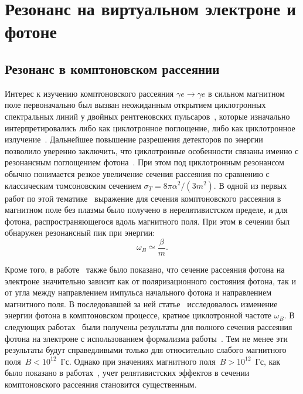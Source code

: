 \section{Резонанс на виртуальном электроне и фотоне}\label{sec:resonance}
\subsection{Резонанс в комптоновском рассеянии}
Интерес к изучению комптоновского рассеяния $\gamma e \to \gamma e$ в 
сильном магнитном поле первоначально был вызван неожиданным открытием циклотронных 
спектральных линий у двойных рентгеновских 
пульсаров~\cite{Truemper1978,Makishima1990,Grove1995}, которые изначально 
интерпретировались либо как циклотронное поглощение, либо как циклотронное 
излучение~\cite{Truemper1978}. Дальнейшее повышение разрешения детекторов по 
энергии позволило уверенно заключить, что циклотронные особенности связаны 
именно с резонансным поглощением фотона~\cite{Mihara:1990}.
При этом под циклотронным резонансом обычно понимается 
резкое увеличение сечения рассеяния по сравнению с классическим томсоновским 
сечением $\sigma_T = 8 \pi \alpha^2 /(3 m^2)$. В одной из первых 
работ по этой тематике~\cite{Canuto:1971} выражение для сечения 
комптоновского 
рассеяния в магнитном поле без плазмы было получено
в нерелятивистском пределе, и для фотона, 
распространяющегося вдоль магнитного поля. При этом в сечении был обнаружен резонансный 
пик при энергии:
\begin{equation}\label{eq:w_B}
	\omega_B\simeq \frac{\beta}{m}.
\end{equation}
 
Кроме того, в работе~\cite{Canuto:1971} также было показано, что сечение рассеяния фотона 
на электроне
значительно зависит как от поляризационного состояния фотона, так и от угла 
между направлением импульса начального фотона и направлением магнитного поля. В 
последовавшей за ней 
статье~\cite{Gnedin1973} 
исследовалось изменение энергии фотона в комптоновском процессе, кратное 
циклотронной частоте $\omega_B$. 
В следующих работах~\cite{Borner1979,Ventura:1979} 
были получены результаты для полного сечения рассеяния фотона на электроне с использованием формализма работы~\cite{Canuto:1971}. Тем не менее эти результаты будут справедливыми только для относительно слабого магнитного поля~$B<10^{12}$~Гс. Однако при значениях магнитного поля~$B>10^{12}$~Гс, как было показано в работах~\cite{Herold:1979,Melrose:1983III},   учет релятивистских эффектов в сечении комптоновского рассеяния становится 
существенным.

